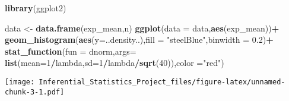 \documentclass[]{article}
\newenvironment{Shaded}{\begin{snugshade}}{\end{snugshade}}
\newcommand{\KeywordTok}[1]{\textcolor[rgb]{0.13,0.29,0.53}{\textbf{#1}}}
\newcommand{\DataTypeTok}[1]{\textcolor[rgb]{0.13,0.29,0.53}{#1}}
\newcommand{\DecValTok}[1]{\textcolor[rgb]{0.00,0.00,0.81}{#1}}
\newcommand{\FloatTok}[1]{\textcolor[rgb]{0.00,0.00,0.81}{#1}}
\newcommand{\StringTok}[1]{\textcolor[rgb]{0.31,0.60,0.02}{#1}}
\newcommand{\OperatorTok}[1]{\textcolor[rgb]{0.81,0.36,0.00}{\textbf{#1}}}
\newcommand{\NormalTok}[1]{#1}
\begin{document}
\begin{Shaded}
\begin{Highlighting}[]
\KeywordTok{library}\NormalTok{(ggplot2)}

\NormalTok{data <-}\StringTok{ }\KeywordTok{data.frame}\NormalTok{(exp_mean,n)}
\KeywordTok{ggplot}\NormalTok{(}\DataTypeTok{data =}\NormalTok{ data,}\KeywordTok{aes}\NormalTok{(exp_mean))}\OperatorTok{+}
\StringTok{  }\KeywordTok{geom_histogram}\NormalTok{(}\KeywordTok{aes}\NormalTok{(}\DataTypeTok{y=}\NormalTok{..density..),}\DataTypeTok{fill =} \StringTok{"steelBlue"}\NormalTok{,}\DataTypeTok{binwidth =} \FloatTok{0.2}\NormalTok{)}\OperatorTok{+}
\StringTok{  }\KeywordTok{stat_function}\NormalTok{(}\DataTypeTok{fun =}\NormalTok{ dnorm,}\DataTypeTok{args=} \KeywordTok{list}\NormalTok{(}\DataTypeTok{mean=}\DecValTok{1}\OperatorTok{/}\NormalTok{lambda,}\DataTypeTok{sd=}\DecValTok{1}\OperatorTok{/}\NormalTok{lambda}\OperatorTok{/}\KeywordTok{sqrt}\NormalTok{(}\DecValTok{40}\NormalTok{)),}\DataTypeTok{color =}\StringTok{"red"}\NormalTok{)}
\end{Highlighting}
\end{Shaded}

\texttt{[image: Inferential\_Statistics\_Project\_files/figure-latex/unnamed-chunk-3-1.pdf]}
\end{document}

